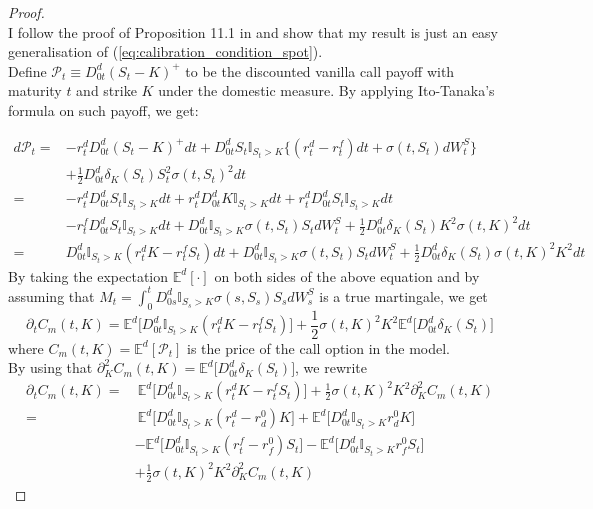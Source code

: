 \begin{proof}\ \\
I follow the proof of Proposition 11.1 in \cite{guyonLabordere} and show that my result is just an easy generalisation of (\ref{eq:calibration_condition_spot}). \\
Define $\mathcal{P}_t\equiv D^d_{0t}(S_t-K)^+$ to be the discounted vanilla call payoff with maturity $t$ and strike $K$ under the domestic measure. By applying Ito-Tanaka's formula on such payoff, we get:

\begin{align*}
d\mathcal{P}_t  = & - r_t^d D^d_{0t}(S_t-K)^+dt + D^d_{0t}S_t\mathbb{I}_{S_t>K} \{ (r_t^d-r_t^f)dt + \sigma(t,S_t)dW^S_t \}\\
& + \frac{1}{2} D^d_{0t}\delta_K(S_t)S^2_t\sigma(t,S_t)^2dt \\
= &  - r_t^d D^d_{0t}S_t\mathbb{I}_{S_t>K}dt + r_t^d D^d_{0t}K\mathbb{I}_{S_t>K}dt + r_t^d D^d_{0t}S_t\mathbb{I}_{S_t>K}dt\\
&  -r_t^f D^d_{0t}S_t\mathbb{I}_{S_t>K}dt + D^d_{0t}\mathbb{I}_{S_t>K}\sigma(t,S_t)S_tdW^S_t+ \frac{1}{2} D^d_{0t}\delta_K(S_t)K^2\sigma(t,K)^2dt\\
= & D^d_{0t}\mathbb{I}_{S_t>K}(r_t^d K- r_t^f S_t)dt +  D^d_{0t}\mathbb{I}_{S_t>K}\sigma(t,S_t)S_tdW^S_t 
+ \frac{1}{2} D^d_{0t}\delta_K(S_t)\sigma(t,K)^2K^2 dt
\end{align*}
By taking the expectation $\mathbb{E}^d[\cdot]$ on both sides of the above equation and by assuming that $ M_t =\int_0^tD^d_{0s}\mathbb{I}_{S_s>K}\sigma(s,S_s)S_s dW^S_s$ is a true martingale, we get
$$ \partial_tC_m(t,K)= \mathbb{E}^d\big[ D^d_{0t}\mathbb{I}_{S_t>K}(r_t^d K- r_t^f S_t) \big] + \frac{1}{2}\sigma(t,K)^2K^2 \mathbb{E}^d\big[ D^d_{0t}\delta_K(S_t) \big]$$
where $C_m(t,K)= \mathbb{E}^d[\mathcal{P}_t]$ is the price of the call option in the model.\\
By using that $\partial_K^2C_m(t,K)= \mathbb{E}^d\big[ D^d_{0t}\delta_K(S_t) \big] $, we rewrite
\begin{align*}
\partial_tC_m(t,K) = &\ \mathbb{E}^d\big[ D^d_{0t}\mathbb{I}_{S_t>K}(r_t^d K- r_t^f S_t) \big] + \frac{1}{2}\sigma(t,K)^2K^2\partial_K^2C_m(t,K)\\
= &\ \mathbb{E}^d\big[ D^d_{0t}\mathbb{I}_{S_t>K}(r_t^d - r_d^0 )K \big] + \mathbb{E}^d\big[ D^d_{0t}\mathbb{I}_{S_t>K} r_d^0 K \big] \\
&-\mathbb{E}^d\big[ D^d_{0t}\mathbb{I}_{S_t>K}(r_t^f - r_f^0 )S_t \big] - \mathbb{E}^d\big[ D^d_{0t}\mathbb{I}_{S_t>K} r_f^0 S_t \big]\\
& + \frac{1}{2}\sigma(t,K)^2K^2\partial_K^2C_m(t,K)
\end{align*}


\end{proof}
